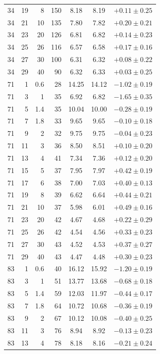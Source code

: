\documentclass[11pt,a4paper]{article}
\begin{document}
{\begin{longtable}{rrrrccc}
34 & 19 & 8 & 150 & 8.18 & 8.19 & $+0.11 \pm 0.25$ \\
34 & 21 & 10 & 135 & 7.80 & 7.82 & $+0.20 \pm 0.21$ \\
34 & 23 & 20 & 126 & 6.81 & 6.82 & $+0.14 \pm 0.23$ \\
34 & 25 & 26 & 116 & 6.57 & 6.58 & $+0.17 \pm 0.16$ \\
34 & 27 & 30 & 100 & 6.31 & 6.32 & $+0.08 \pm 0.22$ \\
34 & 29 & 40 & 90 & 6.32 & 6.33 & $+0.03 \pm 0.25$ \\
\midrule
71 & 1 & 0.6 & 28 & 14.25 & 14.12 & $-1.02 \pm 0.19$ \\
71 & 3 & 1 & 35 & 6.92 & 6.82 & $-1.65 \pm 0.35$ \\
71 & 5 & 1.4 & 35 & 10.04 & 10.00 & $-0.28 \pm 0.19$ \\
71 & 7 & 1.8 & 33 & 9.65 & 9.65 & $-0.10 \pm 0.18$ \\
71 & 9 & 2 & 32 & 9.75 & 9.75 & $-0.04 \pm 0.23$ \\
71 & 11 & 3 & 36 & 8.50 & 8.51 & $+0.10 \pm 0.20$ \\
71 & 13 & 4 & 41 & 7.34 & 7.36 & $+0.12 \pm 0.20$ \\
71 & 15 & 5 & 37 & 7.95 & 7.97 & $+0.42 \pm 0.19$ \\
71 & 17 & 6 & 38 & 7.00 & 7.03 & $+0.40 \pm 0.13$ \\
71 & 19 & 8 & 39 & 6.62 & 6.64 & $+0.44 \pm 0.21$ \\
71 & 21 & 10 & 37 & 5.98 & 6.01 & $+0.49 \pm 0.16$ \\
71 & 23 & 20 & 42 & 4.67 & 4.68 & $+0.22 \pm 0.29$ \\
71 & 25 & 26 & 42 & 4.54 & 4.56 & $+0.33 \pm 0.23$ \\
71 & 27 & 30 & 43 & 4.52 & 4.53 & $+0.37 \pm 0.27$ \\
71 & 29 & 40 & 43 & 4.47 & 4.48 & $+0.30 \pm 0.23$ \\
\midrule
83 & 1 & 0.6 & 40 & 16.12 & 15.92 & $-1.20 \pm 0.19$ \\
83 & 3 & 1 & 51 & 13.77 & 13.68 & $-0.68 \pm 0.18$ \\
83 & 5 & 1.4 & 59 & 12.03 & 11.97 & $-0.44 \pm 0.17$ \\
83 & 7 & 1.8 & 64 & 10.72 & 10.68 & $-0.36 \pm 0.19$ \\
83 & 9 & 2 & 67 & 10.12 & 10.08 & $-0.40 \pm 0.25$ \\
83 & 11 & 3 & 76 & 8.94 & 8.92 & $-0.13 \pm 0.23$ \\
83 & 13 & 4 & 78 & 8.18 & 8.16 & $-0.21 \pm 0.24$ \\

\end{longtable}}
\end{document}
